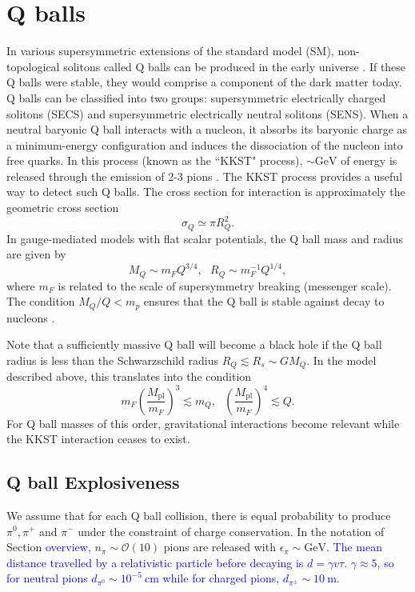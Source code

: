 \documentclass[twocolumn,showpacs,preprintnumbers,amsmath,amssymb,prl]{revtex4}
\newcommand{\OO}{\mathcal{O}}
\newcommand{\Mpl}{M_{\text{pl}}}
\def\r{\right)}
\def\l{\left(}
\begin{document}
\section{Q balls}
In various supersymmetric extensions of the standard model (SM), non-topological solitons called Q balls can be produced in the early universe \cite{Coleman:1985ki, Kusenko:1997si}. If these Q balls were stable, they would comprise a component of the dark matter today. Q balls can be classified into two groups: supersymmetric electrically charged solitons (SECS) and supersymmetric electrically neutral solitons (SENS). When a neutral baryonic Q ball interacts with a nucleon, it absorbs its baryonic charge as a minimum-energy configuration and induces the dissociation of the nucleon into free quarks. In this process (known as the ``KKST" process), $\sim \text{GeV}$ of energy is released through the emission of 2-3 pions \cite{Dine:2003ax}. The KKST process provides a useful way to detect such Q balls. The cross section for interaction is approximately the geometric cross section
\begin{equation}
\sigma_Q \simeq \pi R_Q^2.
\end{equation}
In gauge-mediated models with flat scalar potentials, the Q ball mass and radius are given by
\begin{equation}
M_Q \sim m_F Q^{3/4}, ~~~ R_Q \sim m_F^{-1} Q^{1/4},
\end{equation}
where $m_F$ is related to the scale of supersymmetry breaking (messenger scale). The condition $M_Q/Q < m_p$ ensures that the Q ball is stable against decay to nucleons \cite{Dine:2003ax}.

Note that a sufficiently massive Q ball will become a black hole if the Q ball radius is less than the Schwarzschild radius $R_Q \lesssim R_s \sim G M_Q$. In the model described above, this translates into the condition
\begin{equation}
m_F \l\frac{\Mpl}{m_F}\r^3 \lesssim m_Q, ~~~ \l\frac{\Mpl}{m_F}\r^4 \lesssim Q.
\end{equation}
For Q ball masses of this order, gravitational interactions become relevant while the KKST interaction ceases to exist.

\subsection{Q ball Explosiveness}
We assume that for each Q ball collision, there is equal probability to produce $\pi^0, \pi^+$ and $\pi^-$ under the constraint of charge conservation. In the notation of Section \textcolor{blue}{overview}, $n_{\pi} \sim \OO(10)$ pions are released with $\epsilon_{\pi} \sim \text{GeV}$. \textcolor{blue}{The mean distance travelled by a relativistic particle before decaying is $d = \gamma v \tau$. $\gamma \approx 5$, so for neutral pions $d_{\pi^0} \sim 10^{-5} ~\text{cm}$ while for charged pions, $d_{\pi^\pm} \sim 10 ~\text{m}$.}
\end{document}
